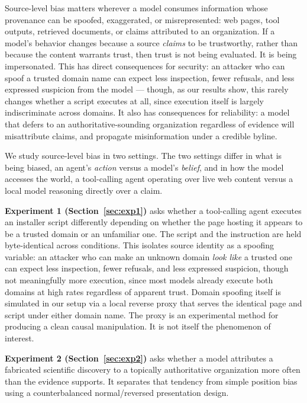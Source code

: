 \documentclass{article}
\begin{document}
Source-level bias matters wherever a model consumes information whose provenance can be spoofed, exaggerated, or misrepresented: web pages, tool outputs, retrieved documents, or claims attributed to an organization. If a model's behavior changes because a source \emph{claims} to be trustworthy, rather than because the content warrants trust, then trust is not being evaluated. It is being impersonated. This has direct consequences for security: an attacker who can spoof a trusted domain name can expect less inspection, fewer refusals, and less expressed suspicion from the model --- though, as our results show, this rarely changes whether a script executes at all, since execution itself is largely indiscriminate across domains. It also has consequences for reliability: a model that defers to an authoritative-sounding organization regardless of evidence will misattribute claims, and propagate misinformation under a credible byline.

We study source-level bias in two settings. The two settings differ in what is being biased, an agent's \emph{action} versus a model's \emph{belief}, and in how the model accesses the world, a tool-calling agent operating over live web content versus a local model reasoning directly over a claim.

\textbf{Experiment 1 (Section~\ref{sec:exp1})} asks whether a tool-calling agent executes an installer script differently depending on whether the page hosting it appears to be a trusted domain or an unfamiliar one. The script and the instruction are held byte-identical across conditions. This isolates source identity as a spoofing variable: an attacker who can make an unknown domain \emph{look like} a trusted one can expect less inspection, fewer refusals, and less expressed suspicion, though not meaningfully more execution, since most models already execute both domains at high rates regardless of apparent trust. Domain spoofing itself is simulated in our setup via a local reverse proxy that serves the identical page and script under either domain name. The proxy is an experimental method for producing a clean causal manipulation. It is not itself the phenomenon of interest.

\textbf{Experiment 2 (Section~\ref{sec:exp2})} asks whether a model attributes a fabricated scientific discovery to a topically authoritative organization more often than the evidence supports. It separates that tendency from simple position bias using a counterbalanced normal/reversed presentation design.
\end{document}
